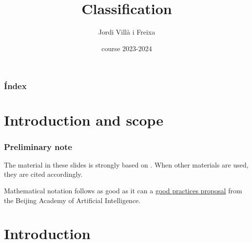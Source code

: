 \documentclass{beamer}
\title[Classification]{Classification} %
\author{Jordi Villà i Freixa} %
\institute[FCTE] %
{
Universitat de Vic - Universitat Central de Catalunya \\
Study Abroad\\ %
\medskip
\textit{jordi.villa@uvic.cat} %
}
\date{course 2023-2024}
\begin{document}
\begin{frame}
\titlepage %
\end{frame}

\begin{frame}
\frametitle{Índex} %
\tableofcontents %
\end{frame}

\section{Introduction and scope}
\begin{frame}
  \frametitle{Preliminary note}
  The material in these slides is strongly based on \cite{kroese2020}. When other materials are used, they are cited accordingly.

  Mathematical notation follows as good as it can a \href{https://ctan.math.utah.edu/ctan/tex-archive/macros/latex/contrib/mlmath/mlmath.pdf}{good practices proposal} from the Beijing Academy of Artificial Intelligence.
  \end{frame}

\section{Introduction} %

\end{document}
